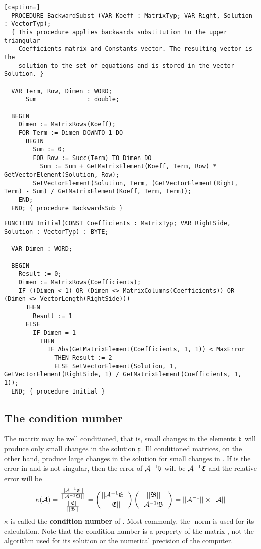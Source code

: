 \begin{lstlisting}[caption=]
  PROCEDURE BackwardSubst (VAR Koeff : MatrixTyp; VAR Right, Solution : VectorTyp);
  { This procedure applies backwards substitution to the upper triangular
    Coefficients matrix and Constants vector. The resulting vector is the
    solution to the set of equations and is stored in the vector Solution. }

  VAR Term, Row, Dimen : WORD;
      Sum              : double;

  BEGIN
    Dimen := MatrixRows(Koeff);
    FOR Term := Dimen DOWNTO 1 DO
      BEGIN
        Sum := 0;
        FOR Row := Succ(Term) TO Dimen DO
          Sum := Sum + GetMatrixElement(Koeff, Term, Row) * GetVectorElement(Solution, Row);
        SetVectorElement(Solution, Term, (GetVectorElement(Right, Term) - Sum) / GetMatrixElement(Koeff, Term, Term));
    END;
  END; { procedure BackwardsSub }
\end{lstlisting}

\begin{lstlisting}[caption=Test if matrix is suitable]
  FUNCTION Initial(CONST Coefficients : MatrixTyp; VAR RightSide, Solution : VectorTyp) : BYTE;

  VAR Dimen : WORD;

  BEGIN
    Result := 0;
    Dimen := MatrixRows(Coefficients);
    IF ((Dimen < 1) OR (Dimen <> MatrixColumns(Coefficients)) OR (Dimen <> VectorLength(RightSide)))
      THEN
        Result := 1
      ELSE
        IF Dimen = 1
          THEN
            IF Abs(GetMatrixElement(Coefficients, 1, 1)) < MaxError
              THEN Result := 2
              ELSE SetVectorElement(Solution, 1, GetVectorElement(RightSide, 1) / GetMatrixElement(Coefficients, 1, 1));
  END; { procedure Initial }
\end{lstlisting}

\subsection{The condition number}

The matrix  may  be well conditioned, that is, small changes in the elements \(\mathfrak{b} \) will produce only small changes in the solution \(\mathfrak{x} \). Ill conditioned matrices, on the other hand, produce large changes in the solution for small changes in . If  is the error in  and  is not singular, then the error of \(\mathcal{A}^{-1}\mathfrak{b} \) will be \(\mathcal{A}^{-1}\mathfrak{E} \) and the relative error will be
\begin{equation}
  \kappa(\mathcal{A}) = \frac{\frac{||\mathcal{A}^{-1}\mathfrak{E}||}{||\mathcal{A}^{-1}\mathfrak{B}||}}{\frac{||\mathfrak{E}||}{||\mathfrak{B}||}}
  = \left(\frac{||\mathcal{A}^{-1}\mathfrak{E}||}{||\mathfrak{E}||}\right) \left(\frac{||\mathfrak{B}||}{||\mathcal{A}^{-1}\mathfrak{B}||} \right) = ||\mathcal{A}^{-1}|| \times ||\mathcal{A}||
\end{equation}
\( \kappa \) is called the \textbf{condition number} of . Most commonly, the -norm is used for its calculation. Note that the condition number is a property of the matrix , not the algorithm used for its solution or the numerical precision of the computer.

